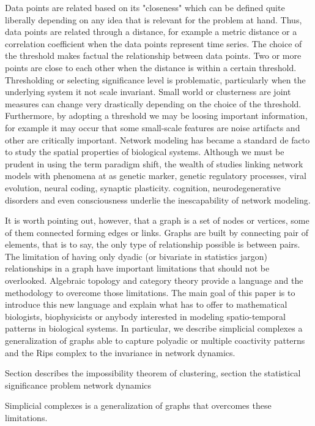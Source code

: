 \documentclass[onecollarge,runningheads]{svjour2}
\begin{document}
Data points are related based on its "closeness" which can be defined quite liberally depending on any idea that is relevant for the problem at hand. Thus, data points are related through a distance, for example a metric distance or a correlation coefficient when the data points represent time series. The choice of the threshold makes factual the relationship between data points. Two or more points are close to each other when the distance is within a certain threshold. 
Thresholding or selecting significance level is problematic, particularly when the underlying system it not scale invariant. Small world or clusterness are joint measures can change very drastically depending on the choice of the threshold. Furthermore, by adopting a threshold  we may be loosing important information, for example it may occur that some small-scale features are noise artifacts and other are critically important.   
Network modeling has became a standard de facto to study the spatial properties of biological systems. 
Although we must be prudent in using the term paradigm shift, the wealth of studies linking network models  with phenomena at  as genetic marker, genetic regulatory processes, viral evolution, neural coding, synaptic plasticity. cognition, neurodegenerative disorders and even consciousness underlie the inescapability of network modeling.  

It is worth pointing out, however, that a graph is a set of nodes or vertices, some of them connected forming edges or links. Graphs are built by connecting pair of elements, that is to say, the only type of relationship possible is between pairs. 
The limitation of having only dyadic (or bivariate in statistics jargon) relationships in a graph have important limitations that should not be overlooked.
Algebraic topology and category theory provide a language and the methodology to overcome those limitations.
The main goal of this paper is to introduce this new language and explain what has to offer to mathematical biologists, biophysicists or anybody interested in modeling spatio-temporal patterns in biological systems.
In particular, we describe simplicial complexes  a generalization of graphs able to capture polyadic or multiple coactivity patterns and the Rips complex to the invariance in network dynamics.

Section describes the impossibility theorem of clustering, section the  statistical significance problem network dynamics 


Simplicial complexes is a generalization of graphs that overcomes these limitations. 
\end{document}
